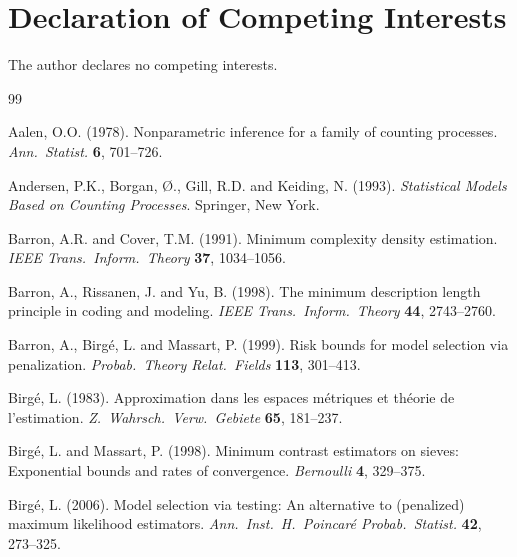 \documentclass[preprint,review,12pt]{article}
\begin{document}
\section*{Declaration of Competing Interests}

The author declares no competing interests.




\begin{thebibliography}{99}

Aalen, O.O. (1978).
Nonparametric inference for a family of counting processes.
\textit{Ann.\ Statist.} \textbf{6}, 701--726.

Andersen, P.K., Borgan, {\O}., Gill, R.D. and Keiding, N. (1993).
\textit{Statistical Models Based on Counting Processes}.
Springer, New York.

Barron, A.R. and Cover, T.M. (1991).
Minimum complexity density estimation.
\textit{IEEE Trans.\ Inform.\ Theory} \textbf{37}, 1034--1056.

Barron, A., Rissanen, J. and Yu, B. (1998).
The minimum description length principle in coding and modeling.
\textit{IEEE Trans.\ Inform.\ Theory} \textbf{44}, 2743--2760.

Barron, A., Birg\'e, L. and Massart, P. (1999).
Risk bounds for model selection via penalization.
\textit{Probab.\ Theory Relat.\ Fields} \textbf{113}, 301--413.

Birg\'e, L. (1983).
Approximation dans les espaces m\'etriques et th\'eorie de l'estimation.
\textit{Z.\ Wahrsch.\ Verw.\ Gebiete} \textbf{65}, 181--237.

Birg\'e, L. and Massart, P. (1998).
Minimum contrast estimators on sieves: Exponential bounds and rates of convergence.
\textit{Bernoulli} \textbf{4}, 329--375.

Birg\'e, L. (2006).
Model selection via testing: An alternative to (penalized) maximum likelihood estimators.
\textit{Ann.\ Inst.\ H.\ Poincar\'e Probab.\ Statist.} \textbf{42}, 273--325.


\end{thebibliography}
\end{document}
